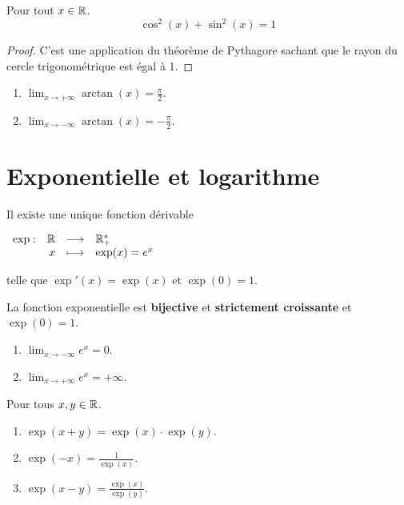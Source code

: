 \begin{proposition}
    Pour tout $x \in \mathbb{R}$.
    \[ \cos^2(x) + \sin^2(x) = 1 \]
\end{proposition}

\begin{proof}
    C'est une application du théorème de Pythagore sachant que le rayon du cercle trigonométrique est égal à 1.
\end{proof}

\begin{proposition}
    \begin{enumerate}
        \item $\lim_{x \to +\infty} \arctan(x) = \frac{\pi}{2}$.
        \item $\lim_{x \to -\infty} \arctan(x) = -\frac{\pi}{2}$.
    \end{enumerate}
\end{proposition}

\section{Exponentielle et logarithme}

\begin{theorem}
	Il existe une unique fonction dérivable 
	\begin{center}
		$
		\begin{array}{rrcl} \exp : & \mathbb{R} & \longrightarrow & \mathbb{R}_+^* \\ & x & \longmapsto & \exp(x) = e^x \end{array}
		$
	\end{center}
	telle que $\exp'(x) = \exp(x)$ et $\exp(0) = 1$.
\end{theorem}

\begin{proposition}
	La fonction exponentielle est \textbf{bijective} et \textbf{strictement croissante} et $\exp(0) = 1$.
    \begin{enumerate}
            \item $\lim_{x \to -\infty} e^x = 0$.
            \item $\lim_{x \to +\infty} e^x = +\infty$.
        \end{enumerate}
    \noindent Pour tous $x, y \in \mathbb{R}$.
    \begin{enumerate}
            \item $\exp(x + y) = \exp(x) \cdot \exp(y)$.
            \item $\exp(-x) = \frac{1}{\exp(x)}$.
            \item $\exp(x - y) = \frac{\exp(x)}{\exp(y)}$.
        \end{enumerate}
\end{proposition}

